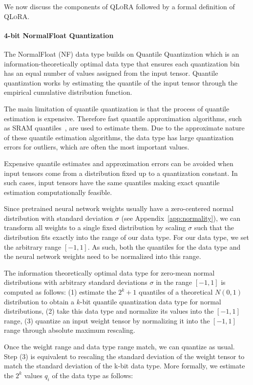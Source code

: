 We now discuss the components of \textsc{QLoRA} followed by a formal definition of \textsc{QLoRA}.

\paragraph{4-bit NormalFloat Quantization} The NormalFloat (NF) data type builds on Quantile Quantization \citep{dettmers2022optimizers} which is an information-theoretically optimal data type that ensures each quantization bin has an equal number of values assigned from the input tensor. Quantile quantization works by estimating the quantile of the input tensor through the empirical cumulative distribution function. 

The main limitation of quantile quantization is that the process of quantile estimation is expensive. Therefore fast quantile approximation algorithms, such as SRAM quantiles~\citep{dettmers2022optimizers}, are used to estimate them. Due to the approximate nature of these quantile estimation algorithms, the data type has large quantization errors for outliers, which are often the most important values.

Expensive quantile estimates and approximation errors can be avoided when input tensors come from a distribution fixed up to a quantization constant. In such cases, input tensors have the same quantiles making exact quantile estimation computationally feasible.

Since pretrained neural network weights usually have a zero-centered normal distribution with standard deviation $\sigma$ (see Appendix~\ref{app:normality}), we can transform all weights to a single fixed distribution by scaling $\sigma$ such that the distribution fits exactly into the range of our data type. For our data type, we set the arbitrary range $[-1, 1]$. As such, both the quantiles for the data type and the neural network weights need to be normalized into this range.

The information theoretically optimal data type for zero-mean normal distributions with arbitrary standard deviations $\sigma$ in the range $[-1, 1]$ is computed as follows: (1) estimate the $2^k+1$ quantiles of a theoretical $N(0, 1)$ distribution to obtain a $k$-bit quantile quantization data type for normal distributions, (2) take this data type and normalize its values into the $[-1, 1]$ range, (3) quantize an input weight tensor by normalizing it into the $[-1, 1]$ range through absolute maximum rescaling. 

Once the weight range and data type range match, we can quantize as usual. Step (3) is equivalent to rescaling the standard deviation of the weight tensor to match the standard deviation of the k-bit data type. More formally, we estimate the $2^k$ values $q_i$ of the data type as follows:

